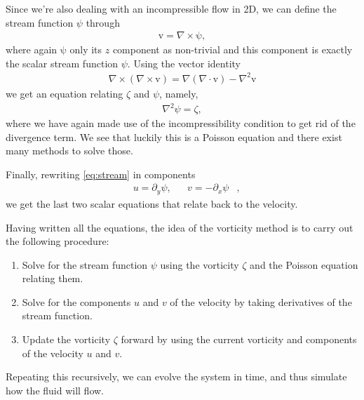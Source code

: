 \documentclass[10pt,a4paper,twocolumn]{article}
\renewcommand{\vec}[1]{\bm{\mathrm{#1}}}
\begin{document}
Since we're also dealing with an incompressible flow in 2D, we can define the stream function $\psi$ through
%
\begin{align}\label{eq:stream}
    \vec{v} = \nabla \times \vec{\psi},
\end{align}
%
where again $\vec{\psi}$ only its $z$ component as non-trivial and this component is exactly the scalar stream function $\psi$. Using the vector identity
%
\begin{align}
    \nabla \times (\nabla \times \vec{v}) = \nabla(\nabla \cdot \vec{v}) - \nabla^2 \vec{v}
\end{align}
%
we get an equation relating $\zeta$ and $\psi$, namely,
%
\begin{align}\label{eq:poisson}
    \nabla^2 \psi = \zeta,
\end{align}
%
where we have again made use of the incompressibility condition to get rid of the divergence term. We see that luckily this is a Poisson equation and there exist many methods to solve those.

Finally, rewriting \cref{eq:stream} in components
%
\begin{align}
    &u = \partial_y \psi,& &v = - \partial_x \psi&,
\end{align}
%
we get the last two scalar equations that relate back to the velocity.

Having written all the equations, the idea of the vorticity method is to carry out the following procedure:
%
\begin{enumerate}
    \item Solve for the stream function $\psi$ using the vorticity $\zeta$ and the Poisson equation relating them.
    \item Solve for the components $u$ and $v$ of the velocity by taking derivatives of the stream function.
    \item Update the vorticity $\zeta$ forward by using the current vorticity and components of the velocity $u$ and $v$.
\end{enumerate}

Repeating this recursively, we can evolve the system in time, and thus simulate how the fluid will flow.
\end{document}
